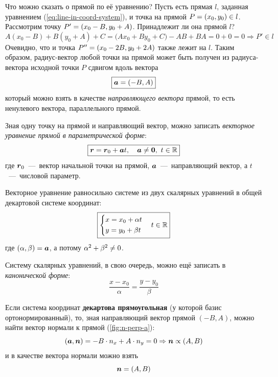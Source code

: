 \documentclass[a4paper,12pt]{article}
\begin{document}
  Что можно сказать о прямой по её уравнению?
  Пусть есть прямая $l$, заданная уравнением (\ref{eq:line-in-coord-system}), и точка на прямой $P \hm= (x_0, y_0) \hm\in l$.
  Рассмотрим точку $P' \hm= (x_0 \hm- B, y_0 \hm+ A)$.
  Принадлежит ли она прямой $l$?
  \[
    A (x_0 - B) + B (y_0 + A) + C
    = \bigl(A x_0 + B y_0 + C\bigr) - AB + BA
    = 0 + 0
    = 0
    \Rightarrow P' \in l
  \]
  Очевидно, что и точка $P'' \hm= (x_0 \hm- 2B, y_0 \hm+ 2A)$ также лежит на $l$.
  Таким образом, радиус-вектор любой точки на прямой может быть получен из радиуса-вектора исходной точки $P$ сдвигом вдоль вектора
  \begin{equation}
    \boxed{\boldsymbol a = (-B, A)}
  \end{equation}
  который можно взять в качестве \emph{направляющего вектора} прямой, то есть ненулевого вектора, параллельного прямой.
  
  Зная одну точку на прямой и направляющий вектор, можно записать \emph{векторное уравнение прямой в параметрической форме}:
  \begin{equation}\label{eq:line-as-radius-vector}
    \boxed{\boldsymbol{r} = \boldsymbol{r}_0 + \boldsymbol{a} t, \quad \boldsymbol{a} \not= \boldsymbol{0},\ t \in \operatorname{\mathbb R}}
  \end{equation}
  где $\boldsymbol r_0$~---~вектор начальной точки на прямой, $\boldsymbol a$~---~направляющий вектор, а $t$~---~числовой параметр.
  
  Векторное уравнение равносильно системе из двух скалярных уравнений в общей декартовой системе координат:
  \begin{equation}
    \boxed{\left\{
      \begin{aligned}
        &x = x_0 + \alpha t\\
        &y = y_0 + \beta t
      \end{aligned}
    \right.\quad t \in \operatorname{\mathbb R}}
  \end{equation}
  где $(\alpha, \beta) \hm= \bds a$, а потому $\alpha^2 \hm+ \beta^2 \hm{\not=} 0$.
  
  Систему скалярных уравнений, в свою очередь, можно ещё записать в \emph{канонической форме}:
  \[
    \boxed{\frac{x - x_0}{\alpha} = \frac{y - y_0}{\beta}}
  \]
  
  Если система координат \textbf{декартова прямоугольная} (у которой базис ортонормированный), то, зная направляющий вектор прямой $(-B, A)$, можно найти вектор нормали к прямой (\ref{fig:n-perp-a}):
  \[
    (\boldsymbol a, \boldsymbol n) = -B \cdot n_x + A \cdot n_y = 0 \Rightarrow \boldsymbol n \propto (A, B)
  \]
  и в качестве вектора нормали можно взять
  \begin{equation}
    \boldsymbol n = (A, B)
  \end{equation}
  
\end{document}
